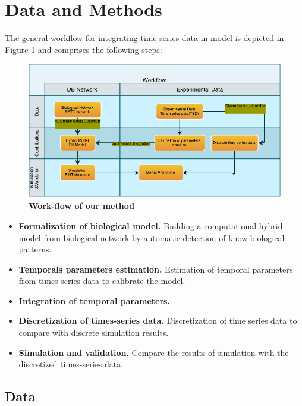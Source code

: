 
\section{Data and Methods}


The general workflow for integrating time-series data in model is depicted in Figure \ref{fig:workflow} and comprises the following steps:

\begin{figure}[!t]
 \centering
 \includegraphics[width=6.5in]{images/workflow-1.png}
\caption{{\bf Work-flow of our method}} 
 \label{fig:workflow}
\end{figure}

\begin{itemize}
 \item \textbf{Formalization of biological model.} Building a computational hybrid model  from biological network by automatic detection of know biological patterns.
 \item \textbf{Temporals parameters estimation.} Estimation of temporal parameters from times-series data to calibrate the model.
 \item \textbf{Integration of temporal parameters.} 
 \item \textbf{Discretization of times-series data.} Discretization of time series data to compare with discrete simulation results.
 \item \textbf{Simulation and validation.} Compare the results of simulation with the discretized times-series data.
\end{itemize}

\subsection{Data}

